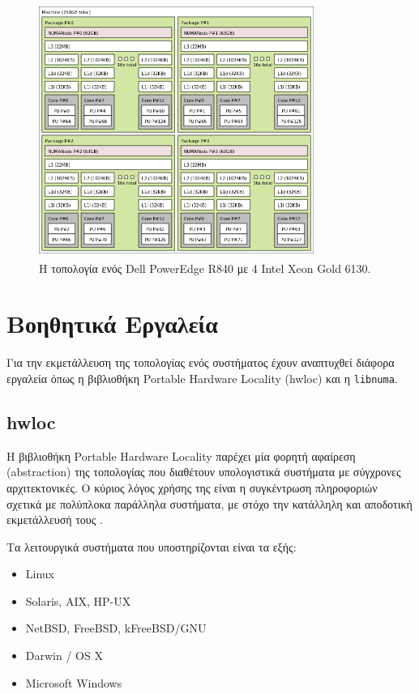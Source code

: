\begin{figure}[t]
	\centering
	\includegraphics[width=0.8\textwidth]{Figures/parade-topo.png}
	\linebreak
	\caption{Η τοπολογία ενός Dell PowerEdge R840 με 4 Intel\textsuperscript{\textregistered} Xeon\textsuperscript{\textregistered} Gold 6130.}
	\label{fig:parade-topo}
\end{figure}


\section{Βοηθητικά Εργαλεία}
\label{sec:Utility Tools}
Για την εκμετάλλευση της τοπολογίας ενός συστήματος έχουν αναπτυχθεί διάφορα εργαλεία όπως η βιβλιοθήκη Portable Hardware Locality (hwloc) και η \texttt{libnuma}.

\subsection{hwloc}
Η βιβλιοθήκη Portable Hardware Locality παρέχει μία φορητή αφαίρεση (abstraction) της τοπολογίας που διαθέτουν υπολογιστικά συστήματα με σύγχρονες αρχιτεκτονικές. Ο κύριος λόγος χρήσης της είναι η συγκέντρωση πληροφοριών σχετικά με πολύπλοκα παράλληλα συστήματα, με στόχο την κατάλληλη και αποδοτική εκμετάλλευσή τους \cite{broquedis2010hwloc}. 

\noindent Τα λειτουργικά συστήματα που υποστηρίζονται είναι τα εξής:
\begin{itemize}
	\item Linux
	\item Solaris, AIX, HP-UX
	\item NetBSD, FreeBSD, kFreeBSD/GNU
	\item Darwin / OS X
	\item Microsoft Windows
\end{itemize}

